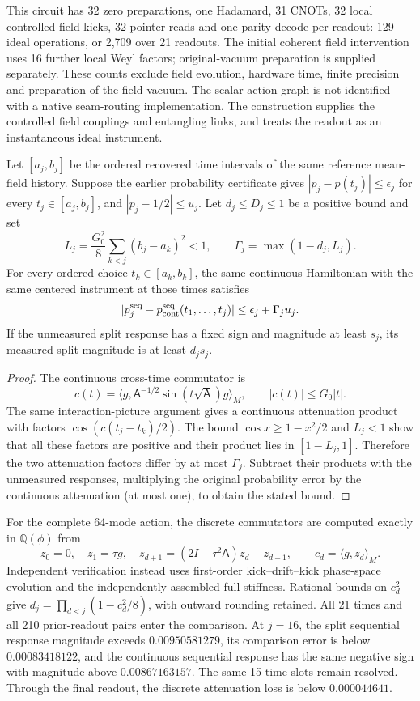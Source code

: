 This circuit has 32 zero preparations, one Hadamard, 31 CNOTs, 32 local
controlled field kicks, 32 pointer reads and one parity decode per readout:
129 ideal operations, or 2,709 over 21 readouts. The initial coherent field
intervention uses 16 further local Weyl factors; original-vacuum preparation
is supplied separately. These counts exclude field evolution, hardware
time, finite precision and preparation of the field vacuum. The scalar
action graph is not identified with a native seam-routing implementation.
The construction supplies the controlled field couplings and entangling
links, and treats the readout as an instantaneous ideal instrument.

\begin{proposition}
\label{prop:source-scalar-sequential-comparison}
Let $[a_j,b_j]$ be the ordered recovered time intervals of the same
reference mean-field history. Suppose the earlier probability certificate
gives $|p_j-p(t_j)|\le\epsilon_j$ for every $t_j\in[a_j,b_j]$,
and $|p_j-1/2|\le u_j$. Let $d_j\le D_j\le1$ be a positive bound and set
\[
 L_j=\frac{G_0^2}{8}\sum_{k<j}(b_j-a_k)^2<1,
 \qquad \Gamma_j=\max(1-d_j,L_j).
\]
For every ordered choice $t_k\in[a_k,b_k]$, the same continuous
Hamiltonian with the same centered instrument at those times satisfies
\[
 |p_j^{\rm seq}-p^{\rm seq}_{\rm cont}(t_1,\ldots,t_j)|
 \le\epsilon_j+\Gamma_j u_j.
\]
If the unmeasured split response has a fixed sign and magnitude at least
$s_j$, its measured split magnitude is at least $d_js_j$.
\end{proposition}
\begin{proof}
The continuous cross-time commutator is
\[
 c(t)=\langle g,\mathsf A^{-1/2}
                 \sin(t\sqrt{\mathsf A})g\rangle_M,
 \qquad |c(t)|\le G_0|t|.
\]
The same interaction-picture argument gives a continuous attenuation
product with factors $\cos(c(t_j-t_k)/2)$. The bound
$\cos x\ge1-x^2/2$ and $L_j<1$ show that all these factors are positive
and their product lies in $[1-L_j,1]$. Therefore the two attenuation
factors differ by at most $\Gamma_j$. Subtract their products with the
unmeasured responses, multiplying the original probability error by the
continuous attenuation (at most one), to obtain the stated bound.
\end{proof}

For the complete 64-mode action, the discrete commutators are computed
exactly in $\mathbb Q(\phi)$ from
\[
 z_0=0,\quad z_1=\tau g,\quad
 z_{d+1}=(2I-\tau^2\mathsf A)z_d-z_{d-1},\qquad
 c_d=\langle g,z_d\rangle_M.
\]
Independent verification instead uses first-order kick--drift--kick
phase-space evolution and the independently assembled full stiffness.
Rational bounds on $c_d^2$ give
$d_j=\prod_{d<j}(1-\overline{c_d^2}/8)$, with outward rounding retained.
All 21 times and all 210 prior-readout pairs enter the comparison. At
$j=16$, the split sequential response magnitude exceeds $0.00950581279$, its comparison
error is below $0.00083418122$, and the continuous sequential response
has the same negative sign with magnitude above $0.00867163157$.
The same 15 time slots remain resolved. Through the final readout, the
discrete attenuation loss is below $0.000044641$.

